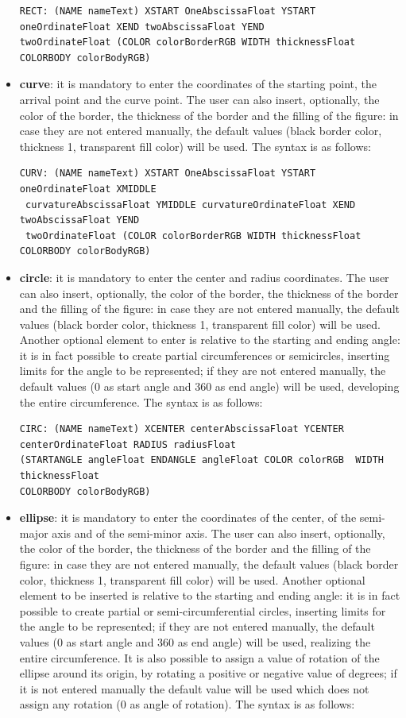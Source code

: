 \documentclass[a4paper]{article}
\begin{document}
\begin{itemize}
\begin{verbatim}
RECT: (NAME nameText) XSTART OneAbscissaFloat YSTART oneOrdinateFloat XEND twoAbscissaFloat YEND 
twoOrdinateFloat (COLOR colorBorderRGB WIDTH thicknessFloat COLORBODY colorBodyRGB)
\end{verbatim}
\item \textbf{curve}: 
it is mandatory to enter the coordinates of the starting point, the arrival point and the curve point. The user can also insert, optionally, the color of the border, the thickness of the border and the filling of the figure: in case they are not entered manually, the default values (black border color, thickness 1, transparent fill color) will be used. The syntax is as follows:
\begin{verbatim}
CURV: (NAME nameText) XSTART OneAbscissaFloat YSTART oneOrdinateFloat XMIDDLE
 curvatureAbscissaFloat YMIDDLE curvatureOrdinateFloat XEND twoAbscissaFloat YEND 
 twoOrdinateFloat (COLOR colorBorderRGB WIDTH thicknessFloat 
COLORBODY colorBodyRGB)
\end{verbatim}
\item \textbf{circle}: 
it is mandatory to enter the center and radius coordinates. The user can also insert, optionally, the color of the border, the thickness of the border and the filling of the figure: in case they are not entered manually, the default values (black border color, thickness 1, transparent fill color) will be used. Another optional element to enter is relative to the starting and ending angle: it is in fact possible to create partial circumferences or semicircles, inserting limits for the angle to be represented; if they are not entered manually, the default values (0 as start angle and 360 as end angle) will be used, developing the entire circumference. The syntax is as follows:
\begin{verbatim}
CIRC: (NAME nameText) XCENTER centerAbscissaFloat YCENTER centerOrdinateFloat RADIUS radiusFloat
(STARTANGLE angleFloat ENDANGLE angleFloat COLOR colorRGB  WIDTH thicknessFloat 
COLORBODY colorBodyRGB)
\end{verbatim}
\item \textbf{ellipse}: it is mandatory to enter the coordinates of the center, of the semi-major axis and of the semi-minor axis. The user can also insert, optionally, the color of the border, the thickness of the border and the filling of the figure: in case they are not entered manually, the default values (black border color, thickness 1, transparent fill color) will be used. Another optional element to be inserted is relative to the starting and ending angle: it is in fact possible to create partial or semi-circumferential circles, inserting limits for the angle to be represented; if they are not entered manually, the default values (0 as start angle and 360 as end angle) will be used, realizing the entire circumference. It is also possible to assign a value of rotation of the ellipse around its origin, by rotating a positive or negative value of degrees; if it is not entered manually the default value will be used which does not assign any rotation (0 as angle of rotation). The syntax is as follows:

\end{itemize}
\end{document}
